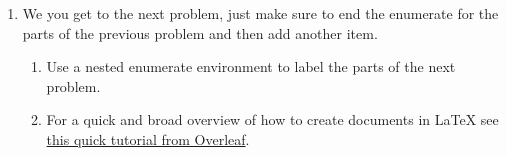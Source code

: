\documentclass{article}
\begin{document}
\begin{enumerate}[leftmargin=\labelsep]
\begin{enumerate}
    \item For more details on putting math into {\LaTeX} documents you can see 
    \href{https://www.overleaf.com/learn/latex/Mathematical_expressions}{this page on Overleaf}.
    \end{enumerate}

\item We you get to the next problem, just make sure to end the enumerate for the parts of the previous
problem and then add another item.
    \begin{enumerate}
    \item Use a nested enumerate environment to label the parts of the next problem.
    \item For a quick and broad overview of how to create documents in {\LaTeX} see 
    \href{https://www.overleaf.com/learn/latex/Learn_LaTeX_in_30_minutes}{this quick tutorial from Overleaf}.
    \end{enumerate}
\end{enumerate}
\end{document}
